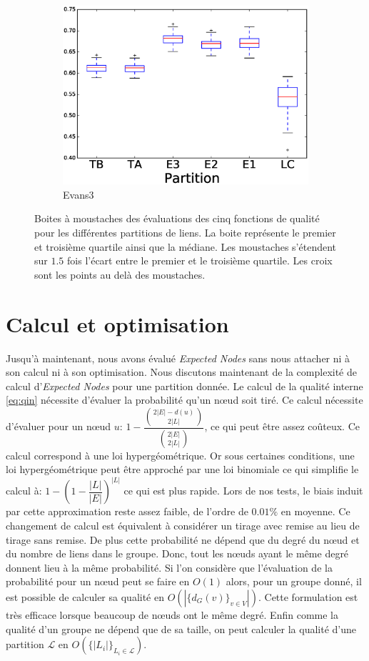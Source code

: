 \begin{figure}
\begin{subfigure}{0.31\textwidth}
		\includegraphics[width=\linewidth]{img/ExpectedNodes/LF/LFR1_Evans3_ALL.eps}
		\caption{\label{fig:LFE3}Evans3}		
	\end{subfigure}
	\caption{Boites à moustaches des évaluations des cinq fonctions de qualité pour les différentes partitions de liens. 
	La boite représente le premier et troisième quartile ainsi que la médiane.
	Les moustaches s'étendent sur $1.5$ fois l'écart entre le premier et le troisième quartile. 
	Les croix sont les points au delà des moustaches.
	}
	\label{fig:LF}
\end{figure}


\section{Calcul et optimisation}
Jusqu'à maintenant, nous avons évalué \emph{Expected Nodes} sans nous attacher ni à son calcul ni à son optimisation.
Nous discutons maintenant de la complexité de calcul d'\emph{Expected Nodes} pour une partition donnée.
Le calcul de la qualité interne \ref{eq:qin} nécessite d'évaluer la probabilité qu'un n\oe{}ud soit tiré.
Ce calcul nécessite d'évaluer pour un n\oe{}ud $u$: $1 - \dfrac{ \binom{2|E|-d(u)}{2|L|} }{ \binom{2|E|}{2|L|} }$, ce qui peut être assez coûteux.
Ce calcul correspond à une loi hypergéométrique.
Or sous certaines conditions, une loi hypergéométrique peut être approché par une loi binomiale ce qui simplifie le calcul à: $1 - (1- \dfrac{|L|}{|E|})^{|L|}$ ce qui est plus rapide.
Lors de nos tests, le biais induit par cette approximation reste assez faible, de l'ordre de $0.01\%$ en moyenne.
Ce changement de calcul est équivalent à considérer un tirage avec remise au lieu de tirage sans remise.
De plus cette probabilité ne dépend que du degré du n\oe{}ud et du nombre de liens dans le groupe.
Donc, tout les n\oe{}uds ayant le même degré donnent lieu à la même probabilité.
Si l'on considère que l'évaluation de la probabilité pour un n\oe{}ud peut se faire en $O(1)$ alors, pour un groupe donné, il est possible de calculer sa qualité en $O(|\{d_G(v)\}_{v \in V}|)$.
Cette formulation est très efficace lorsque beaucoup de n\oe{}uds ont le même degré.
Enfin comme la qualité d'un groupe ne dépend que de sa taille, on peut calculer la qualité d'une partition $\mathcal{L}$ en $O(\{|L_i|\}_{L_i \in \mathcal{L}})$.

